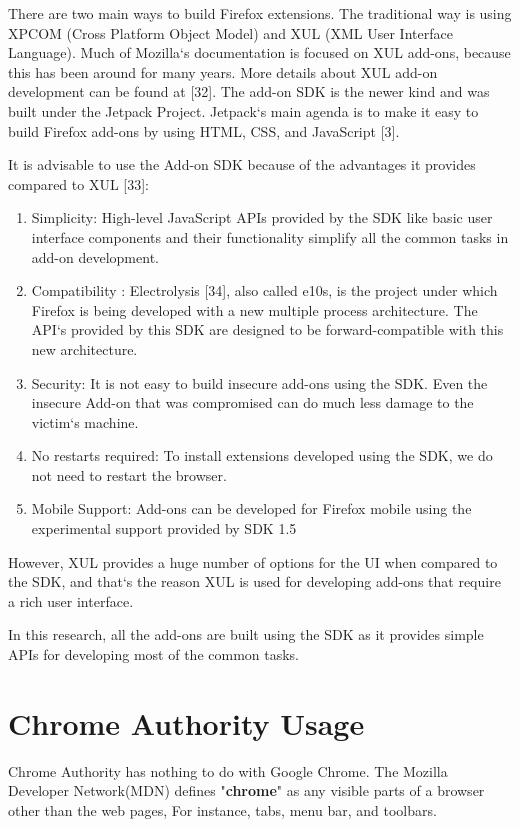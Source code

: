 There are two main ways to build Firefox extensions. The traditional way is using XPCOM (Cross Platform Object Model) and XUL (XML User Interface Language). Much of Mozilla`s documentation is focused on XUL add-ons, because this has been around for many years. More details about XUL add-on development can be found at [32]. The add-on SDK is the newer kind and was built under the Jetpack Project. Jetpack`s main agenda is to make it easy to build Firefox add-ons by using HTML, CSS, and JavaScript [3].

It is advisable to use the Add-on SDK because of the advantages it provides compared to XUL [33]:

\begin{enumerate}
\item Simplicity: High-level JavaScript APIs provided by the SDK like basic user interface components and their functionality simplify all the common tasks in add-on development. 
\item Compatibility : Electrolysis [34], also called e10s, is the project under which Firefox is being developed with a new multiple process architecture. The API`s provided by this SDK are designed to be forward-compatible with this new architecture. 
\item Security: It is not easy to build insecure add-ons using the SDK. Even the insecure Add-on that was compromised can do much less damage to the victim`s machine.
\item No restarts required: To install extensions developed using the SDK, we do not need to restart the browser.
\item Mobile Support: Add-ons can be developed for Firefox mobile using the experimental support provided by SDK 1.5
\end{enumerate}

However, XUL provides a huge number of options for the UI when compared to the SDK, and that`s the reason XUL is used for developing add-ons that require a rich user interface.

In this research, all the add-ons are built using the SDK as it provides simple APIs for developing most of the common tasks.

\section{Chrome Authority Usage}

Chrome Authority has nothing to do with Google Chrome. The Mozilla Developer Network(MDN) defines "\textbf{chrome}" as any visible parts of a browser other than the web pages, For instance, tabs, menu bar, and toolbars.

